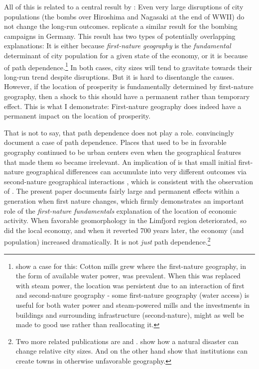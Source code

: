 \documentclass[11pt]{article}
\begin{document}
All of this is related to a central result by \cite{Davis2002}: Even very large disruptions of city populations (the bombs over Hiroshima and Nagasaki at the end of WWII) do not change the long-run outcomes. \cite{Brakman2004Bombs} replicate a similar result for the bombing campaigns in Germany. This result has two types of potentially overlapping explanations: It is either because \textit{first-nature geography} is the \textit{fundamental} determinant of city population for a given state of the economy, or it is because of path dependence.\footnote{\cite{CraftsWolf2014} show a case for this: Cotton mills grew where the first-nature geography, in the form of available water power, was prevalent. When this was replaced with steam power, the location was persistent due to an interaction of first and second-nature geography - some first-nature geography (water access) is useful for both water power and steam-powered mills and the investments in buildings and surrounding infrastructure (second-nature), might as well be made to good use rather than reallocating it.} In both cases, city sizes will tend to gravitate towards their long-run trend despite disruptions. But it is hard to disentangle the causes. However, if the location of prosperity is fundamentally determined by first-nature geography, then a shock to this should have a permanent rather than temporary effect. This is what I demonstrate: First-nature geography does indeed have a permanent impact on the location of prosperity. 

That is not to say, that path dependence does not play a role. \cite{Bleakley2012} convincingly document a case of path dependence. Places that used to be in favorable geography continued to be urban centers even when the geographical features that made them so became irrelevant. An implication of \cite{Krugman1991} is that small initial first-nature geographical differences can accumulate into very different outcomes via second-nature geographical interactions \citep{Caruana-Galizia_Okubo_Wolf_2021}, which is consistent with the observation of \cite{Bleakley2012}. The present paper documents fairly large and permanent effects within a generation when first nature changes, which firmly demonstrates an important role of the \textit{first-nature fundamentals} explanation of the location of economic activity. When favorable geomorphology in the Limfjord region deteriorated, so did the local economy, and when it reverted 700 years later, the economy (and population) increased dramatically. It is not \textit{just} path dependence.\footnote{Two more related publications are \cite{Ager2020a} and \cite{Cermeno2019}. \cite{Ager2020a} show how a natural disaster can change relative city sizes. And on the other hand \cite{Cermeno2019} show that institutions can create towns in otherwise unfavorable geography.}
\end{document}
